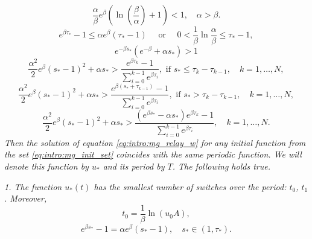 \begin{equation}
	\label{eq:intro:cond_thm1}
	\frac{\alpha}{\beta}e^{\beta}\left(\ln\left(\frac{\beta}{\alpha}\right)+1\right) < 1,
	\quad
	\alpha > \beta.
\end{equation}
%
\begin{equation}
	\label{eq:intro:cond_thm2}
	e^{\beta \tau_*}-1 \leqslant \alpha e^\beta(\tau_*-1)
	\quad\text{ or }\quad
	0 < \frac{1}{\beta}\ln\frac{\alpha}{\beta}\leqslant\tau_*-1,
\end{equation}
%
\begin{equation}
	\label{eq:intro:cond_th_w>1_t_1+1}
	e^{-\beta s_*}(e^{-\beta}+\alpha s_*)>1
\end{equation}
%
\begin{equation}
	\label{eq:intro:cond_hair_hair_01}
	\frac{\alpha^2}{2}e^\beta(s_*-1)^2+\alpha s_*>\frac{e^{\beta \tau_k}-1}{\sum_{i=0}^{k-1}e^{\beta \tau_i}},\text{ if } s_*\leqslant \tau_k-\tau_{k-1},\quad k=1,\ldots,N,
\end{equation}
%
\begin{equation}
	\label{eq:intro:cond_hair_hair_02}
	\frac{\alpha^2}{2}e^\beta(s_*-1)^2+\alpha s_*>\frac{e^{\beta (s_*+\tau_{k-1})}-1}{\sum_{i=0}^{k-1}e^{\beta \tau_i}},\text{ if } s_* > \tau_k-\tau_{k-1},\quad k=1,\ldots,N,
\end{equation}
%
\begin{equation}
	\label{eq:intro:cond_hair_hair_1}
	\frac{\alpha^2}{2}e^\beta( s_*-1)^2+\alpha s_*>\frac{(e^{\beta s_*}-\alpha s_*)e^{\beta \tau_k}-1}{\sum_{i=0}^{k-1}e^{\beta \tau_i}},\quad k=1,\ldots,N.
\end{equation}
\textit{Then the solution of equation \eqref{eq:intro:mg_relay_w} for any initial function from the set \eqref{eq:intro:mg_init_set} coincides with the same periodic function. We will denote this function by $u_*$ and its period by $T$. The following holds true.}

\textit{1. The function $u_*(t)$ has the smallest number of switches over the period: $t_0$, $t_1$. Moreover, }
%
\begin{equation*}
	t_0=\frac{1}{\beta}\ln(u_0 A),
\end{equation*}
\begin{equation}
	e^{\beta s_*} - 1=\alpha e^{\beta}(s_* - 1), \quad s_* \in (1, \tau_*).
\end{equation}

